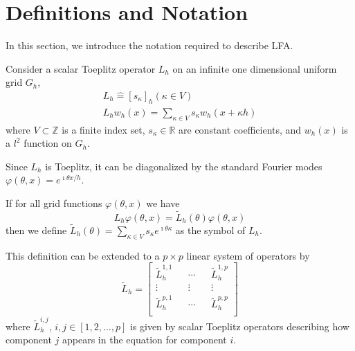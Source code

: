 \documentclass[review]{siamart190516}
\begin{document}
\section{Definitions and Notation}\label{sec:notation}

In this section, we introduce the notation required to describe LFA.

Consider a scalar Toeplitz operator $L_h$ on an infinite one dimensional uniform grid $G_h$,
\begin{equation}
\begin{split}
L_h \mathrel{\hat{=}} \left[ s_\kappa \right]_h \left( \kappa \in V \right)\\
L_h w_h \left( x \right) = \sum_{\kappa \in V} s_\kappa w_h \left( x + \kappa h \right)
\end{split}
\end{equation}
where $V \subset \mathbb{Z}$ is a finite index set, $s_\kappa \in \mathbb{R}$ are constant coefficients, and $w_h \left( x \right)$ is a $l^2$ function on $G_h$.

Since $L_h$ is Toeplitz, it can be diagonalized by the standard Fourier modes $\varphi \left( \theta, x \right) = e^{\imath \theta x / h}$.

\begin{definition}[Symbol of $L_h$]\label{def:symbol}
If for all grid functions $\varphi \left( \theta, x \right)$ we have
\begin{equation}
L_h \varphi \left( \theta, x \right) = \tilde{L}_h \left( \theta \right) \varphi \left( \theta, x \right)
\end{equation}
then we define $\tilde{L}_h \left( \theta \right) = \sum_{\kappa \in V} s_\kappa e^{\imath \theta \kappa}$ as the symbol of $L_h$.
\end{definition}

This definition can be extended to a $p \times p$ linear system of operators by
\begin{equation}
\tilde{L}_h =
\begin{bmatrix}
    \tilde{L}_h^{1, 1} && \cdots && \tilde{L}_h^{1, p} \\
    \vdots             && \vdots && \vdots             \\
    \tilde{L}_h^{p, 1} && \cdots && \tilde{L}_h^{p, p} \\
\end{bmatrix}
\end{equation}
where $\tilde{L}_h^{i, j}$, $i, j \in \left[1, 2, \dots, p \right]$ is given by scalar Toeplitz operators describing how component $j$ appears in the equation for component $i$.
\end{document}
